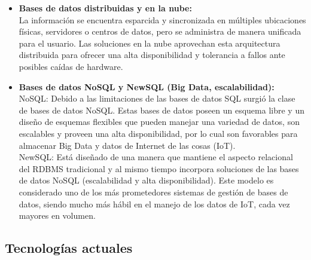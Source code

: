 \documentclass[12pt,a4paper]{article}
\begin{document}
\begin{itemize}
  \item \textbf{Bases de datos distribuidas y en la nube:} \\
  La información se encuentra esparcida y sincronizada en múltiples ubicaciones físicas, servidores o centros de datos, pero se administra de manera unificada para el usuario. Las soluciones en la nube aprovechan esta arquitectura distribuida para ofrecer una alta disponibilidad y tolerancia a fallos ante posibles caídas de hardware.\\

  \item \textbf{Bases de datos NoSQL y NewSQL (Big Data, escalabilidad):} \\
  NoSQL: Debido a las limitaciones de las bases de datos SQL surgió la clase de bases de datos NoSQL. Estas bases de datos poseen un esquema libre y un diseño de esquemas flexibles que pueden manejar una variedad de datos, son escalables y proveen una alta disponibilidad, por lo cual son favorables para almacenar Big Data y datos de Internet de las cosas (IoT).\\
  NewSQL: Está diseñado de una manera que mantiene el aspecto relacional del RDBMS tradicional y al mismo tiempo incorpora soluciones de las bases de datos NoSQL (escalabilidad y alta disponibilidad). Este modelo es considerado uno de los más prometedores sistemas de gestión de bases de datos, siendo mucho más hábil en el manejo de los datos de IoT, cada vez mayores en volumen.
\end{itemize}

\subsection{Tecnologías actuales}
\end{document}
